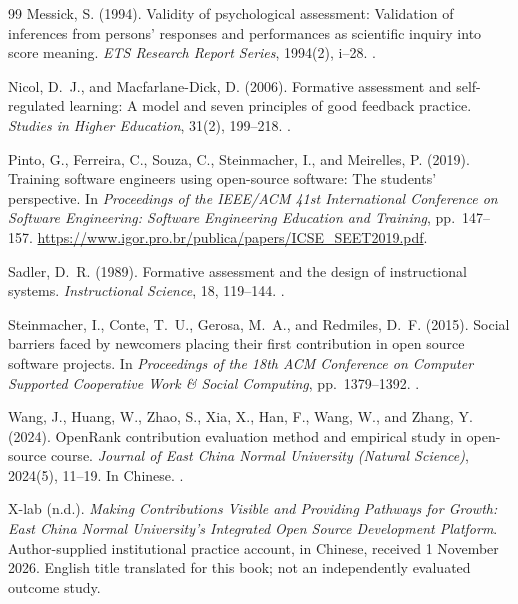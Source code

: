 \begin{thebibliography}{99}
Messick, S. (1994).
Validity of psychological assessment: Validation of inferences from persons' responses and performances as scientific inquiry into score meaning.
\emph{ETS Research Report Series}, 1994(2), i--28.
.

Nicol, D.~J., and Macfarlane-Dick, D. (2006).
Formative assessment and self-regulated learning: A model and seven principles of good feedback practice.
\emph{Studies in Higher Education}, 31(2), 199--218.
.

Pinto, G., Ferreira, C., Souza, C., Steinmacher, I., and Meirelles, P. (2019).
Training software engineers using open-source software: The students' perspective.
In \emph{Proceedings of the IEEE/ACM 41st International Conference on Software Engineering: Software Engineering Education and Training}, pp.~147--157.
\url{https://www.igor.pro.br/publica/papers/ICSE_SEET2019.pdf}.

Sadler, D.~R. (1989).
Formative assessment and the design of instructional systems.
\emph{Instructional Science}, 18, 119--144.
.

Steinmacher, I., Conte, T.~U., Gerosa, M.~A., and Redmiles, D.~F. (2015).
Social barriers faced by newcomers placing their first contribution in open source software projects.
In \emph{Proceedings of the 18th ACM Conference on Computer Supported Cooperative Work \& Social Computing}, pp.~1379--1392.
.

Wang, J., Huang, W., Zhao, S., Xia, X., Han, F., Wang, W., and Zhang, Y. (2024).
OpenRank contribution evaluation method and empirical study in open-source course.
\emph{Journal of East China Normal University (Natural Science)}, 2024(5), 11--19. In Chinese.
.

X-lab (n.d.).
\emph{Making Contributions Visible and Providing Pathways for Growth: East China Normal University's Integrated Open Source Development Platform}.
Author-supplied institutional practice account, in Chinese, received 1 November 2026. English title translated for this book; not an independently evaluated outcome study.


\end{thebibliography}
